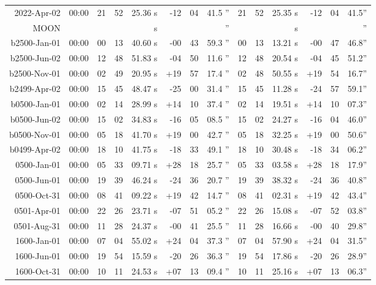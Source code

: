 \begin{longtable}{r@{\,}r|r@{h}r@{m}r<{s}|r@{°}r@{'}r<{''}||r@{h}r@{m}r<{s}|r@{°}r@{'}r<{''}}
 2022-Apr-02 & 00:00  &   21 & 52 & 25.36 & -12 & 04 & 41.5 & 21&52&25.35 & -12&04&41.5\\ %
MOON   \\
b2500-Jan-01 & 00:00  &   00 & 13 & 40.60 & -00 & 43 & 59.3 & 00&13&13.21 & -00&47&46.8\\ %
b2500-Jun-02 & 00:00  &   12 & 48 & 51.83 & -04 & 50 & 11.6 & 12&48&20.54 & -04&45&51.2\\ %
b2500-Nov-01 & 00:00  &   02 & 49 & 20.95 & +19 & 57 & 17.4 & 02&48&50.55 & +19&54&16.7\\ %
b2499-Apr-02 & 00:00  &   15 & 45 & 48.47 & -25 & 00 & 31.4 & 15&45&11.28 & -24&57&59.1\\ %
b0500-Jan-01 & 00:00  &   02 & 14 & 28.99 & +14 & 10 & 37.4 & 02&14&19.51 & +14&10&07.3\\ %
b0500-Jun-02 & 00:00  &   15 & 02 & 34.83 & -16 & 05 & 08.5 & 15&02&24.27 & -16&04&46.0\\ %
b0500-Nov-01 & 00:00  &   05 & 18 & 41.70 & +19 & 00 & 42.7 & 05&18&32.25 & +19&00&50.6\\ %
b0499-Apr-02 & 00:00  &   18 & 10 & 41.75 & -18 & 33 & 49.1 & 18&10&30.48 & -18&34&06.2\\ %
 0500-Jan-01 & 00:00  &   05 & 33 & 09.71 & +28 & 18 & 25.7 & 05&33&03.58 & +28&18&17.9\\ %
 0500-Jun-01 & 00:00  &   19 & 39 & 46.24 & -24 & 36 & 20.7 & 19&39&38.32 & -24&36&40.8\\ %
 0500-Oct-31 & 00:00  &   08 & 41 & 09.22 & +19 & 42 & 14.7 & 08&41&02.31 & +19&42&43.4\\ %
 0501-Apr-01 & 00:00  &   22 & 26 & 23.71 & -07 & 51 & 05.2 & 22&26&15.08 & -07&52&03.8\\ %
 0501-Aug-31 & 00:00  &   11 & 28 & 24.37 & -00 & 41 & 25.5 & 11&28&16.66 & -00&40&29.8\\ %
 1600-Jan-01 & 00:00  &   07 & 04 & 55.02 & +24 & 04 & 37.3 & 07&04&57.90 & +24&04&31.5\\ %
 1600-Jun-01 & 00:00  &   19 & 54 & 15.59 & -20 & 26 & 36.3 & 19&54&17.86 & -20&26&28.9\\ %
 1600-Oct-31 & 00:00  &   10 & 11 & 24.53 & +07 & 13 & 09.4 & 10&11&25.16 & +07&13&06.3\\ %

\end{longtable}
